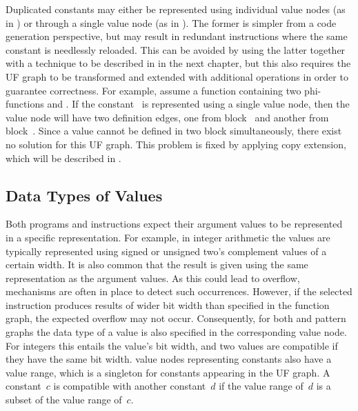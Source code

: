 Duplicated constants may either be represented using individual \glspl{value
  node} (as in ) or through a single
\gls{value node} (as in ).
%
The former is simpler from a \gls{code generation} perspective, but may result
in redundant \glspl{instruction} where the same constant is needlessly reloaded.
%
This can be avoided by using the latter together with a technique to be
described in  in the next chapter, but this
also requires the \gls{UF graph} to be transformed and extended with additional
\glspl{operation} in order to guarantee correctness.
%
For example, assume a \gls{function} containing two \glspl{phi-function}
 and
.
%
If the constant~ is represented using a single \gls{value node}, then
the \gls{value node} will have two \glspl{definition edge}, one from
\gls{block}~ and another from \gls{block}~.
%
Since a value cannot be defined in two \gls{block} simultaneously, there exist
no \gls{solution} for this \gls{UF graph}.
%
This problem is fixed by applying \gls{copy extension}, which will be described
in .


\subsection{Data Types of Values}

Both \glspl{program} and \glspl{instruction} expect their argument values to be
represented in a specific representation.
%
For example, in integer arithmetic the values are typically represented using
signed or unsigned two's complement values of a certain width.
%
It is also common that the result is given using the same representation as the
argument values.
%
As this could lead to overflow, mechanisms are often in place to detect such
occurrences.
%
However, if the selected \gls{instruction} produces results of wider bit width
than specified in the \gls{function graph}, the expected overflow may not occur.
%
Consequently, for both  and \glspl{pattern graph} the
data type of a value is also specified in the corresponding \gls{value node}.
%
For integers this entails the value's bit width, and two values are compatible
if they have the same bit width.
%
\Glspl{value node} representing constants also have a value range, which is a
singleton for constants appearing in the \gls{UF graph}.
%
A constant~$c$ is compatible with another constant~$d$ if the value range of~$d$
is a subset of the value range of~$c$.


